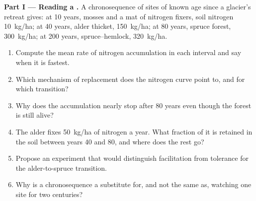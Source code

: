 \begin{problem}
\label{pb:b1:ecosystem-dynamics:1}

\medskip
\noindent\textbf{Part I --- Reading a .}
A chronosequence of sites of known age since a glacier's retreat
gives: at 10 years, mosses and a mat of nitrogen fixers, soil
nitrogen \qty{10}{kg/ha}; at 40 years, alder thicket, \qty{150}{kg/ha};
at 80 years, spruce forest, \qty{300}{kg/ha}; at 200 years,
spruce--hemlock, \qty{320}{kg/ha}.
\begin{enumerate}
  \item Compute the mean rate of nitrogen accumulation in each
        interval and say when it is fastest.
  \item Which mechanism of replacement does the nitrogen curve point
        to, and for which transition?
  \item Why does the accumulation nearly stop after 80 years even
        though the forest is still alive?
  \item The alder fixes \qty{50}{kg/ha} of nitrogen a year. What
        fraction of it is retained in the soil between years 40 and
        80, and where does the rest go?
  \item Propose an experiment that would distinguish facilitation
        from tolerance for the alder-to-spruce transition.
  \item Why is a chronosequence a substitute for, and not the same as,
        watching one site for two centuries?
\end{enumerate}


\end{problem}
